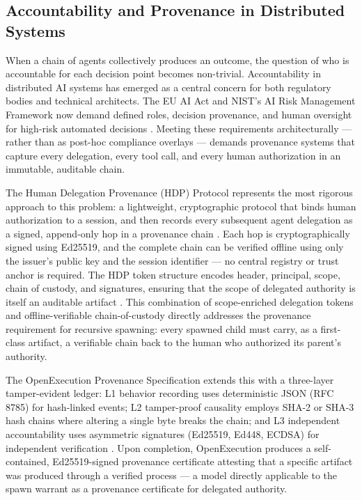\subsection{Accountability and Provenance in Distributed Systems}

When a chain of agents collectively produces an outcome, the question of who is accountable for each decision point becomes non-trivial. Accountability in distributed AI systems has emerged as a central concern for both regulatory bodies and technical architects. The EU AI Act and NIST's AI Risk Management Framework now demand defined roles, decision provenance, and human oversight for high-risk automated decisions \cite{dzone2025accountability}. Meeting these requirements architecturally — rather than as post-hoc compliance overlays — demands provenance systems that capture every delegation, every tool call, and every human authorization in an immutable, auditable chain.

The Human Delegation Provenance (HDP) Protocol represents the most rigorous approach to this problem: a lightweight, cryptographic protocol that binds human authorization to a session, and then records every subsequent agent delegation as a signed, append-only hop in a provenance chain \cite{hdp2026, hdp2025ietf}. Each hop is cryptographically signed using Ed25519, and the complete chain can be verified offline using only the issuer's public key and the session identifier — no central registry or trust anchor is required. The HDP token structure encodes header, principal, scope, chain of custody, and signatures, ensuring that the scope of delegated authority is itself an auditable artifact \cite{hdp2026}. This combination of scope-enriched delegation tokens and offline-verifiable chain-of-custody directly addresses the provenance requirement for recursive spawning: every spawned child must carry, as a first-class artifact, a verifiable chain back to the human who authorized its parent's authority.

The OpenExecution Provenance Specification extends this with a three-layer tamper-evident ledger: L1 behavior recording uses deterministic JSON (RFC 8785) for hash-linked events; L2 tamper-proof causality employs SHA-2 or SHA-3 hash chains where altering a single byte breaks the chain; and L3 independent accountability uses asymmetric signatures (Ed25519, Ed448, ECDSA) for independent verification \cite{openexecution2025}. Upon completion, OpenExecution produces a self-contained, Ed25519-signed provenance certificate attesting that a specific artifact was produced through a verified process — a model directly applicable to the spawn warrant as a provenance certificate for delegated authority.

